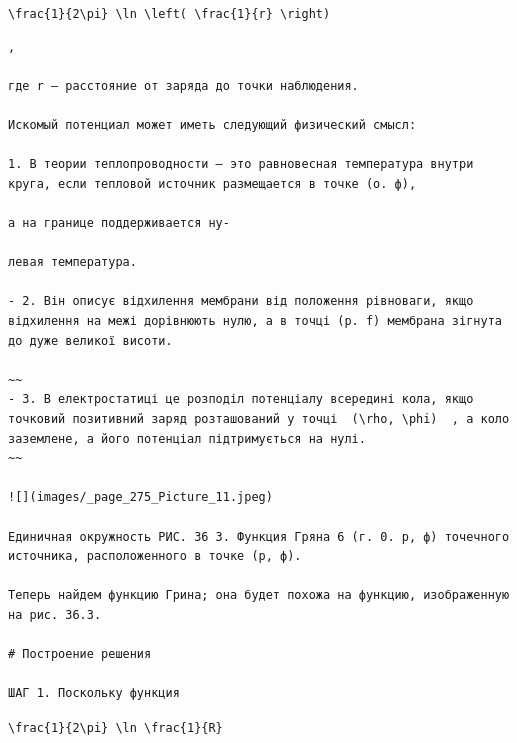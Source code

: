 \documentclass[
  ukrainian,
]{article}
\begin{document}
\texttt{\textbackslash{}frac\{1\}\{2\textbackslash{}pi\}\ \textbackslash{}ln\ \textbackslash{}left(\ \textbackslash{}frac\{1\}\{r\}\ \textbackslash{}right)}

\begin{verbatim}
,

где r — расстояние от заряда до точки наблюдения.

Искомый потенциал может иметь следующий физический смысл:

1. В теории теплопроводности — это равновесная температура внутри круга, если тепловой источник размещается в точке (о. ф),

а на границе поддерживается ну-

левая температура.

- 2. Він описує відхилення мембрани від положення рівноваги, якщо відхилення на межі дорівнюють нулю, а в точці (p. f) мембрана зігнута до дуже великої висоти.

~~
- 3. В електростатиці це розподіл потенціалу всередині кола, якщо точковий позитивний заряд розташований у точці  (\rho, \phi)  , а коло заземлене, а його потенціал підтримується на нулі.
~~

![](images/_page_275_Picture_11.jpeg)

Единичная окружность РИС. 36 3. Функция Гряна 6 (г. 0. р, ф) точечного источника, расположенного в точке (р, ф).

Теперь найдем функцию Грина; она будет похожа на функцию, изображенную на рис. 36.3.

# Построение решения

ШАГ 1. Поскольку функция
\end{verbatim}

\texttt{\textbackslash{}frac\{1\}\{2\textbackslash{}pi\}\ \textbackslash{}ln\ \textbackslash{}frac\{1\}\{R\}}
\end{document}
